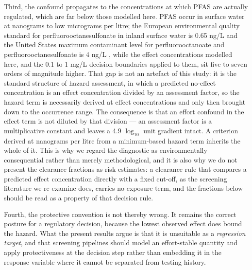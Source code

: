 \documentclass[preprint,12pt]{elsarticle}
\begin{document}
Third, the confound propagates to the concentrations at which PFAS are actually
regulated, which are far below those modelled here. PFAS occur in surface water
at nanograms to low micrograms per litre; the European environmental quality
standard for perfluorooctanesulfonate in inland surface water is 0.65 ng/L
\cite{eu2013directive} and the United States maximum contaminant level for
perfluorooctanoate and perfluorooctanesulfonate is 4 ng/L \cite{epa2024mcl}, while the effect concentrations modelled
here, and the 0.1 to 1 mg/L decision boundaries applied to them, sit five to
seven orders of magnitude higher. That gap is not an artefact of this study: it
is the standard structure of hazard assessment, in which a predicted no-effect
concentration is an effect concentration divided by an assessment factor, so the
hazard term is necessarily derived at effect concentrations and only then
brought down to the occurrence range. The consequence is that an effort
confound in the effect term is not diluted by that division --- an assessment
factor is a multiplicative constant and leaves a 4.9 $\log_{10}$ unit gradient
intact. A criterion derived at nanograms per litre from a minimum-based hazard
term inherits the whole of it. This is why we regard the diagnostic as
environmentally consequential rather than merely methodological, and it is also
why we do not present the clearance fractions as risk estimates: a clearance
rule that compares a predicted effect concentration directly with a fixed
cut-off, as the screening literature we re-examine does, carries no exposure
term, and the fractions below should be read as a property of that decision
rule.

Fourth, the protective convention is not thereby wrong. It remains the correct
posture for a regulatory decision, because the lowest observed effect does bound
the hazard. What the present results argue is that it is unsuitable as a
\emph{regression target}, and that screening pipelines should model an
effort-stable quantity and apply protectiveness at the decision step rather than
embedding it in the response variable where it cannot be separated from testing
history.
\end{document}
